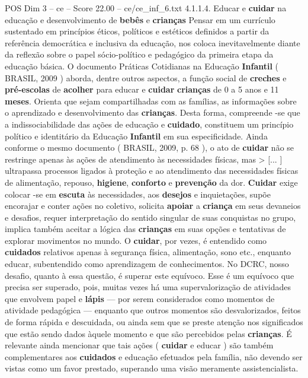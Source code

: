\begin{textsample}{POS Dim 3 – ce – Score 22.00 – ce/ce\_inf\_6.txt}  \label{ex:f3_pos_060}
4.1.1.4.
Educar e \textbf{cuidar} na educação e desenvolvimento de \textbf{bebês} e \textbf{crianças} Pensar em um currículo sustentado em princípios éticos, políticos e estéticos definidos a partir da referência democrática e inclusiva da educação, nos coloca inevitavelmente diante da reflexão sobre o papel sócio-político e pedagógico da primeira etapa da educação básica.
O documento Práticas Cotidianas na Educação \textbf{Infantil} ( BRASIL, 2009 ) aborda, dentre outros aspectos, a função social de \textbf{creches} e \textbf{pré-escolas} de \textbf{acolher} para educar e \textbf{cuidar} \textbf{crianças} de 0 a 5 anos e 11 \textbf{meses}.
Orienta que sejam compartilhadas com as famílias, as informações sobre o aprendizado e desenvolvimento das \textbf{crianças}.
Desta forma, compreende -se que a indissociabilidade das ações de educação e \textbf{cuidado}, constituem um princípio político e identitário da Educação \textbf{Infantil} em sua especificidade.
Ainda conforme o mesmo documento ( BRASIL, 2009, p. 68 ), o ato de \textbf{cuidar} não se restringe apenas às ações de atendimento às necessidades físicas, mas > [... ] ultrapassa processos ligados à proteção e ao atendimento das necessidades físicas de alimentação, repouso, \textbf{higiene}, \textbf{conforto} e \textbf{prevenção} da dor. \textbf{Cuidar} exige colocar -se em \textbf{escuta} às necessidades, aos \textbf{desejos} e inquietações, supõe encorajar e conter ações no coletivo, solicita \textbf{apoiar} a \textbf{criança} em seus devaneios e desafios, requer interpretação do sentido singular de suas conquistas no grupo, implica também aceitar a lógica das \textbf{crianças} em suas opções e tentativas de explorar movimentos no mundo.
O \textbf{cuidar}, por vezes, é entendido como \textbf{cuidados} relativos apenas à segurança física, alimentação, sono etc., enquanto educar, subentendido como aprendizagem de conhecimentos.
No DCRC, nosso desafio, quanto à essa questão, é superar este equívoco.
Esse é um equívoco que precisa ser superado, pois, muitas vezes há uma supervalorização de atividades que envolvem papel e \textbf{lápis} — por serem considerados como momentos de atividade pedagógica — enquanto que outros momentos são desvalorizados, feitos de forma rápida e descuidada, ou ainda sem que se preste atenção nos significados que estão sendo dados àquele momento e que são percebidos pelas \textbf{crianças}.
É relevante ainda mencionar que tais ações ( \textbf{cuidar} e educar ) são também complementares aos \textbf{cuidados} e educação efetuados pela família, não devendo ser vistas como um favor prestado, superando uma visão meramente assistencialista.

\end{textsample}
